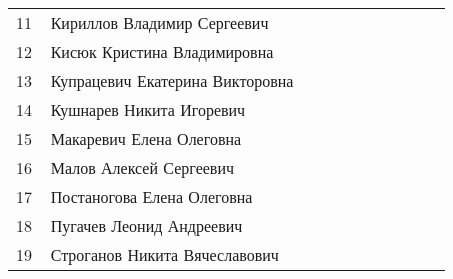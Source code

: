 \documentclass[a4paper,11pt]{article}
\newcommand*\ok{&{\small \ding{51}}} %
\newcommand*\no{&{\small }} %
\begin{document}
\begin{tabular}{p{7pt}|l|p{\CS}|p{\CS}|p{\CS}|p{\CS}|p{\CS}|p{\CS}|p{\CS}|p{\CS}|p{\CS}}
\midrule
11\,&Кириллов Владимир Сергеевич          \no&&&&&&&&\\
12\,&Кисюк Кристина Владимировна          \no\ok&&&&&&&\\
13\,&Купрацевич Екатерина Викторовна      \ok\ok&&&&&&&\\
14\,&Кушнарев Никита Игоревич             \ok\ok&&&&&&&\\
15\,&Макаревич Елена Олеговна             \no\ok&&&&&&&\\
\midrule
16\,&Малов Алексей Сергеевич              \no&&&&&&&&\\
17\,&Постаногова Елена Олеговна           \ok\ok&&&&&&&\\
18\,&Пугачев Леонид Андреевич             \ok&&&&&&&&\\ 
19\,&Строганов Никита Вячеславович        \ok\ok&&&&&&&\\
\bottomrule
\end{tabular} 
\end{document}
